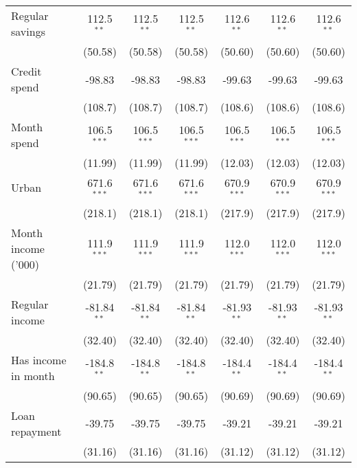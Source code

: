 \begin{table}[htbp]
\begin{footnotesize}
\begin{tabular}{lcccccc}
         Regular savings             & 112.5$^{**}$  & 112.5$^{**}$  & 112.5$^{**}$  & 112.6$^{**}$  & 112.6$^{**}$  & 112.6$^{**}$\\
                                     & (50.58)       & (50.58)       & (50.58)       & (50.60)       & (50.60)       & (50.60)\\
         Credit spend                & -98.83        & -98.83        & -98.83        & -99.63        & -99.63        & -99.63\\
                                     & (108.7)       & (108.7)       & (108.7)       & (108.6)       & (108.6)       & (108.6)\\
         Month spend                 & 106.5$^{***}$ & 106.5$^{***}$ & 106.5$^{***}$ & 106.5$^{***}$ & 106.5$^{***}$ & 106.5$^{***}$\\
                                     & (11.99)       & (11.99)       & (11.99)       & (12.03)       & (12.03)       & (12.03)\\
         Urban                       & 671.6$^{***}$ & 671.6$^{***}$ & 671.6$^{***}$ & 670.9$^{***}$ & 670.9$^{***}$ & 670.9$^{***}$\\
                                     & (218.1)       & (218.1)       & (218.1)       & (217.9)       & (217.9)       & (217.9)\\
         Month income ('000)         & 111.9$^{***}$ & 111.9$^{***}$ & 111.9$^{***}$ & 112.0$^{***}$ & 112.0$^{***}$ & 112.0$^{***}$\\
                                     & (21.79)       & (21.79)       & (21.79)       & (21.79)       & (21.79)       & (21.79)\\
         Regular income              & -81.84$^{**}$ & -81.84$^{**}$ & -81.84$^{**}$ & -81.93$^{**}$ & -81.93$^{**}$ & -81.93$^{**}$\\
                                     & (32.40)       & (32.40)       & (32.40)       & (32.40)       & (32.40)       & (32.40)\\
         Has income in month         & -184.8$^{**}$ & -184.8$^{**}$ & -184.8$^{**}$ & -184.4$^{**}$ & -184.4$^{**}$ & -184.4$^{**}$\\
                                     & (90.65)       & (90.65)       & (90.65)       & (90.69)       & (90.69)       & (90.69)\\
         Loan repayment              & -39.75        & -39.75        & -39.75        & -39.21        & -39.21        & -39.21\\
                                     & (31.16)       & (31.16)       & (31.16)       & (31.12)       & (31.12)       & (31.12)\\

\end{tabular}
\end{footnotesize}
\end{table}
